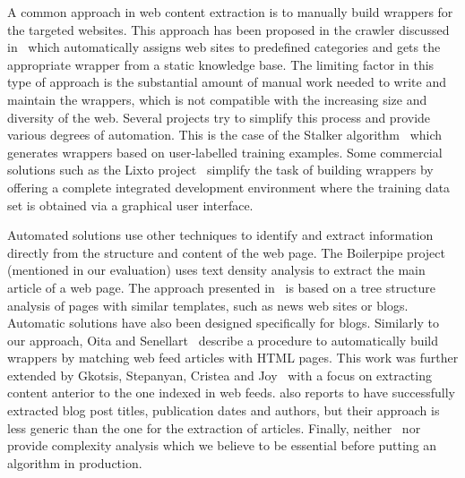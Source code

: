 A common approach in web content extraction is to manually build wrappers for the targeted websites. This approach has been proposed in the crawler discussed in~\cite{faheem2012intelligent} which automatically assigns web sites to predefined categories and gets the appropriate wrapper from a static knowledge base. The limiting factor in this type of approach is the substantial amount of manual work needed to write and maintain the wrappers, which is not compatible with the increasing size and diversity of the web. Several projects try to simplify this process and provide various degrees of automation. This is the case of the Stalker algorithm~\cite{stalker} which generates wrappers based on user-labelled training examples. Some commercial solutions such as the Lixto project~\cite{lixto} simplify the task of building wrappers by offering a complete integrated development environment where the training data set is obtained via a graphical user interface.

Automated solutions use other techniques to identify and extract information directly from the structure and content of the web page. The Boilerpipe project~\cite{kohlschuetter2010} (mentioned in our evaluation) uses text density analysis to extract the main article of a web page. The approach presented in~\cite{treeedit} is based on a tree structure analysis of pages with similar templates, such as news web sites or blogs. Automatic solutions have also been designed specifically for blogs. Similarly to our approach, Oita and Senellart~\cite{oita2010} describe a procedure to automatically build wrappers by matching web feed articles with HTML pages. This work was further extended by Gkotsis, Stepanyan, Cristea and Joy~\cite{gkotsis2013} with a focus on extracting content anterior to the one indexed in web feeds. \cite{gkotsis2013} also reports to have successfully extracted blog post titles, publication dates and authors, but their approach is less generic than the one for the extraction of articles. Finally, neither~\cite{oita2010} nor~\cite{gkotsis2013} provide complexity analysis which we believe to be essential before putting an algorithm in production.

